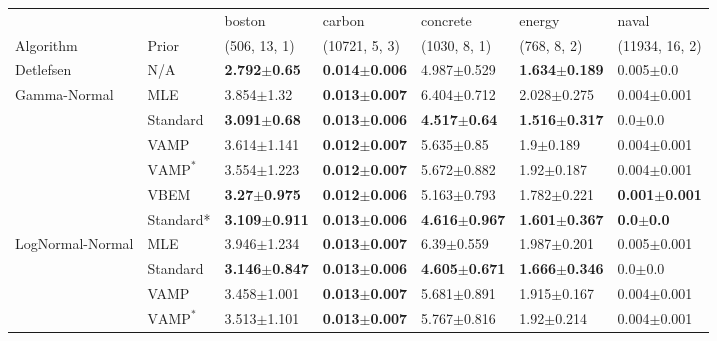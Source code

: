 \begin{tabular}{lllllll}
\toprule
                 &      &                    boston &                    carbon &                  concrete &                    energy &                     naval \\
Algorithm & Prior& (506, 13, 1)& (10721, 5, 3)& (1030, 8, 1)& (768, 8, 2)& (11934, 16, 2)\\
\midrule
Detlefsen & N/A &   \textbf{2.792$\pm$0.65} &  \textbf{0.014$\pm$0.006} &           4.987$\pm$0.529 &  \textbf{1.634$\pm$0.189} &             0.005$\pm$0.0 \\
Gamma-Normal & MLE &            3.854$\pm$1.32 &  \textbf{0.013$\pm$0.007} &           6.404$\pm$0.712 &           2.028$\pm$0.275 &           0.004$\pm$0.001 \\
                 & Standard &   \textbf{3.091$\pm$0.68} &  \textbf{0.013$\pm$0.006} &   \textbf{4.517$\pm$0.64} &  \textbf{1.516$\pm$0.317} &               0.0$\pm$0.0 \\
                 & VAMP &           3.614$\pm$1.141 &  \textbf{0.012$\pm$0.007} &            5.635$\pm$0.85 &             1.9$\pm$0.189 &           0.004$\pm$0.001 \\
                 & $\text{VAMP}^*$ &           3.554$\pm$1.223 &  \textbf{0.012$\pm$0.007} &           5.672$\pm$0.882 &            1.92$\pm$0.187 &           0.004$\pm$0.001 \\
                 & VBEM &   \textbf{3.27$\pm$0.975} &  \textbf{0.012$\pm$0.006} &           5.163$\pm$0.793 &           1.782$\pm$0.221 &  \textbf{0.001$\pm$0.001} \\
                 & Standard* &  \textbf{3.109$\pm$0.911} &  \textbf{0.013$\pm$0.006} &  \textbf{4.616$\pm$0.967} &  \textbf{1.601$\pm$0.367} &      \textbf{0.0$\pm$0.0} \\
LogNormal-Normal & MLE &           3.946$\pm$1.234 &  \textbf{0.013$\pm$0.007} &            6.39$\pm$0.559 &           1.987$\pm$0.201 &           0.005$\pm$0.001 \\
                 & Standard &  \textbf{3.146$\pm$0.847} &  \textbf{0.013$\pm$0.006} &  \textbf{4.605$\pm$0.671} &  \textbf{1.666$\pm$0.346} &               0.0$\pm$0.0 \\
                 & VAMP &           3.458$\pm$1.001 &  \textbf{0.013$\pm$0.007} &           5.681$\pm$0.891 &           1.915$\pm$0.167 &           0.004$\pm$0.001 \\
                 & $\text{VAMP}^*$ &           3.513$\pm$1.101 &  \textbf{0.013$\pm$0.007} &           5.767$\pm$0.816 &            1.92$\pm$0.214 &           0.004$\pm$0.001 \\

\end{tabular}
